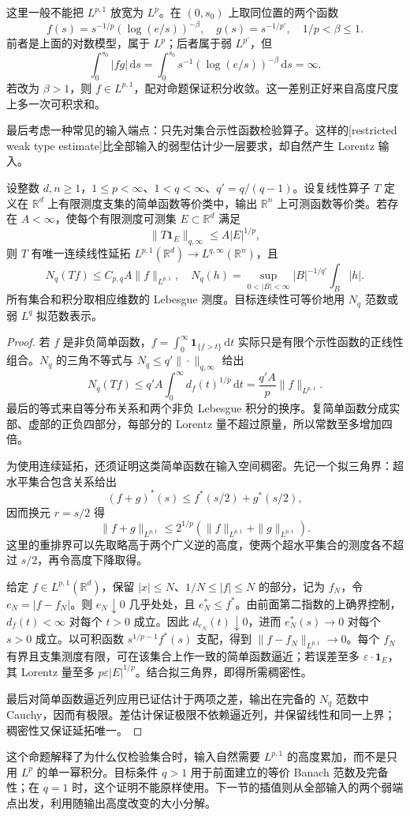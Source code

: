 \ProseParagraphBreak

这里一般不能把 \(L^{p,1}\) 放宽为 \(L^p\)。在 \((0,s_0)\) 上取同位置的两个函数
\[
 f(s)=s^{-1/p}(\log(e/s))^{-\beta},\quad g(s)=s^{-1/p'},
 \quad 1/p<\beta\leq1.
\]
前者是上面的对数模型，属于 \(L^p\)；后者属于弱 \(L^{p'}\)，但
\[\int_0^{s_0}|fg|\,\mathrm ds
 =\int_0^{s_0}s^{-1}(\log(e/s))^{-\beta}\,\mathrm ds=\infty.\]
若改为 \(\beta>1\)，则 \(f\in L^{p,1}\)，配对命题保证积分收敛。这一差别正好来自高度尺度上多一次可积求和。

\ProseParagraphBreak

最后考虑一种常见的输入端点：只先对集合示性函数检验算子。这样的[restricted weak type estimate]比全部输入的弱型估计少一层要求，却自然产生 Lorentz 输入。
\begin{proposition}\label{b2:prop:17-restricted-weak}
设整数 \(d,n\geq1\)，\(1\leq p<\infty\)、\(1<q<\infty\)、\(q'=q/(q-1)\)。设复线性算子 \(T\) 定义在 \(\mathbb R^d\) 上有限测度支集的简单函数等价类中，输出 \(\mathbb R^n\) 上可测函数等价类。若存在 \(A<\infty\)，使每个有限测度可测集 \(E\subset\mathbb R^d\) 满足
\[\|T\mathbf1_E\|_{q,\infty}\leq A|E|^{1/p},\]
则 \(T\) 有唯一连续线性延拓 \(L^{p,1}(\mathbb R^d)\to L^{q,\infty}(\mathbb R^n)\)，且
\[N_q(Tf)\leq C_{p,q}A\|f\|_{L^{p,1}},\quad
 N_q(h)=\sup_{0<|B|<\infty}|B|^{-1/q'}\int_B|h|.\]
所有集合和积分取相应维数的 Lebesgue 测度。目标连续性可等价地用 \(N_q\) 范数或弱 \(L^q\) 拟范数表示。
\end{proposition}
\begin{proof}
若 \(f\) 是非负简单函数，\(f=\int_0^\infty\mathbf1_{\{f>t\}}\,\mathrm dt\) 实际只是有限个示性函数的正线性组合。\(N_q\) 的三角不等式与 \(N_q\leq q'\|\cdot\|_{q,\infty}\) 给出
\[N_q(Tf)\leq q'A\int_0^\infty d_f(t)^{1/p}\,\mathrm dt
 =\frac{q'A}{p}\|f\|_{L^{p,1}}.\]
最后的等式来自等分布关系和两个非负 Lebesgue 积分的换序。复简单函数分成实部、虚部的正负四部分，每部分的 Lorentz 量不超过原量，所以常数至多增加四倍。

为使用连续延拓，还须证明这类简单函数在输入空间稠密。先记一个拟三角界：超水平集合包含关系给出
\[(f+g)^*(s)\leq f^*(s/2)+g^*(s/2),\]
因而换元 \(r=s/2\) 得
\[\|f+g\|_{L^{p,1}}\leq2^{1/p}
 (\|f\|_{L^{p,1}}+\|g\|_{L^{p,1}}).\]
这里的重排界可以先取略高于两个广义逆的高度，使两个超水平集合的测度各不超过 \(s/2\)，再令高度下降取得。

给定 \(f\in L^{p,1}(\mathbb R^d)\)，保留 \(|x|\leq N\)、\(1/N\leq|f|\leq N\) 的部分，记为 \(f_N\)，令 \(e_N=|f-f_N|\)。则 \(e_N\downarrow0\) 几乎处处，且 \(e_N^*\leq f^*\)。由前面第二指数的上确界控制，\(d_f(t)<\infty\) 对每个 \(t>0\) 成立。因此 \(d_{e_N}(t)\downarrow0\)，进而 \(e_N^*(s)\to0\) 对每个 \(s>0\) 成立。以可积函数 \(s^{1/p-1}f^*(s)\) 支配，得到 \(\|f-f_N\|_{L^{p,1}}\to0\)。每个 \(f_N\) 有界且支集测度有限，可在该集合上作一致的简单函数逼近；若误差至多 \(\varepsilon\cdot\mathbf1_E\)，其 Lorentz 量至多 \(p\varepsilon|E|^{1/p}\)。结合拟三角界，即得所需稠密性。

最后对简单函数逼近列应用已证估计于两项之差，输出在完备的 \(N_q\) 范数中 Cauchy，因而有极限。差估计保证极限不依赖逼近列，并保留线性和同一上界；稠密性又保证延拓唯一。
\end{proof}
这个命题解释了为什么仅检验集合时，输入自然需要 \(L^{p,1}\) 的高度累加，而不是只用 \(L^p\) 的单一幂积分。目标条件 \(q>1\) 用于前面建立的等价 Banach 范数及完备性；在 \(q=1\) 时，这个证明不能原样使用。下一节的插值则从全部输入的两个弱端点出发，利用随输出高度改变的大小分解。
